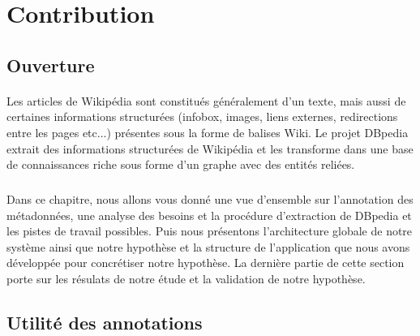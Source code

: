 \documentclass[12pt,a4	]{report}
\begin{document}
\section*{Contribution}
\subsection*{Ouverture}
\paragraph{}
Les articles de Wikipédia sont constitués généralement d'un texte, mais aussi de certaines informations structurées (infobox, images, liens externes, redirections entre les pages etc...) présentes sous la forme de balises Wiki. 
Le projet DBpedia extrait des informations structurées de Wikipédia et les transforme dans une base de connaissances riche sous forme d'un graphe avec des entités reliées.
\subparagraph{}
Dans ce chapitre, nous allons vous donné une vue d'ensemble sur l'annotation des métadonnées, une analyse des besoins et la procédure d'extraction de DBpedia et les pistes de travail possibles. Puis nous présentons l'architecture globale de notre système ainsi que notre hypothèse et la structure de l'application que nous avons développée pour concrétiser notre hypothèse. La dernière partie de cette section porte sur les résulats de notre étude et la validation de notre hypothèse.
\subsection*{Utilité des annotations}
\end{document}
